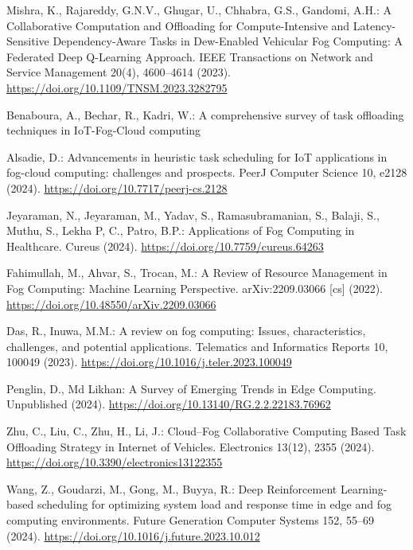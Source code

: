 \documentclass{svproc}
\begin{document}
\begin{thebibliography}{99}

Mishra, K., Rajareddy, G.N.V., Ghugar, U., Chhabra, G.S., Gandomi, A.H.: A Collaborative Computation and Offloading for Compute-Intensive and Latency-Sensitive Dependency-Aware Tasks in Dew-Enabled Vehicular Fog Computing: A Federated Deep Q-Learning Approach. IEEE Transactions on Network and Service Management 20(4), 4600--4614 (2023). \url{https://doi.org/10.1109/TNSM.2023.3282795}

Benaboura, A., Bechar, R., Kadri, W.: A comprehensive survey of task offloading techniques in IoT-Fog-Cloud computing

Alsadie, D.: Advancements in heuristic task scheduling for IoT applications in fog-cloud computing: challenges and prospects. PeerJ Computer Science 10, e2128 (2024). \url{https://doi.org/10.7717/peerj-cs.2128}

Jeyaraman, N., Jeyaraman, M., Yadav, S., Ramasubramanian, S., Balaji, S., Muthu, S., Lekha P, C., Patro, B.P.: Applications of Fog Computing in Healthcare. Cureus (2024). \url{https://doi.org/10.7759/cureus.64263}

Fahimullah, M., Ahvar, S., Trocan, M.: A Review of Resource Management in Fog Computing: Machine Learning Perspective. arXiv:2209.03066 [cs] (2022). \url{https://doi.org/10.48550/arXiv.2209.03066}

Das, R., Inuwa, M.M.: A review on fog computing: Issues, characteristics, challenges, and potential applications. Telematics and Informatics Reports 10, 100049 (2023). \url{https://doi.org/10.1016/j.teler.2023.100049}

Penglin, D., Md Likhan: A Survey of Emerging Trends in Edge Computing. Unpublished (2024). \url{https://doi.org/10.13140/RG.2.2.22183.76962}

Zhu, C., Liu, C., Zhu, H., Li, J.: Cloud--Fog Collaborative Computing Based Task Offloading Strategy in Internet of Vehicles. Electronics 13(12), 2355 (2024). \url{https://doi.org/10.3390/electronics13122355}

Wang, Z., Goudarzi, M., Gong, M., Buyya, R.: Deep Reinforcement Learning-based scheduling for optimizing system load and response time in edge and fog computing environments. Future Generation Computer Systems 152, 55--69 (2024). \url{https://doi.org/10.1016/j.future.2023.10.012}


\end{thebibliography}
\end{document}
